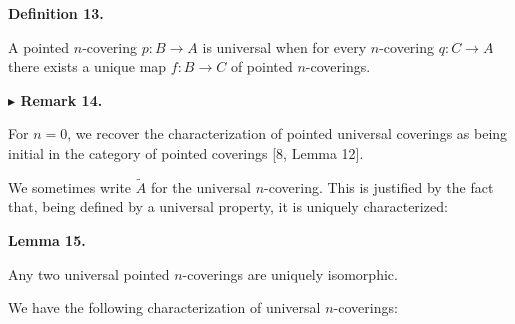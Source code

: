 \documentclass[10pt,a4paper]{article}
\begin{document}
 
 
\par\medskip\noindent\textbf{Definition 13.}\par
 
 
A pointed $n$-covering $p:B\to A$ is universal when for every $n$-covering $q:C\to A$ there exists a unique map $f:B\to C$ of pointed $n$-coverings.\par
 
 
 
 
\par\medskip\noindent\textbf{$\blacktriangleright$ Remark 14.}\par
 
 
For $n=0$, we recover the characterization of pointed universal coverings as being initial in the category of pointed coverings [8, Lemma 12].\par
 
 
 
 
We sometimes write $\tilde{A}$ for the universal $n$-covering. This is justified by the fact that, being defined by a universal property, it is uniquely characterized:\par
 
 
 
\par\medskip\noindent\textbf{Lemma 15.}\par
 
 
Any two universal pointed $n$-coverings are uniquely isomorphic.\par
 
 
 
 
We have the following characterization of universal $n$-coverings:\par
 
 
\end{document}
